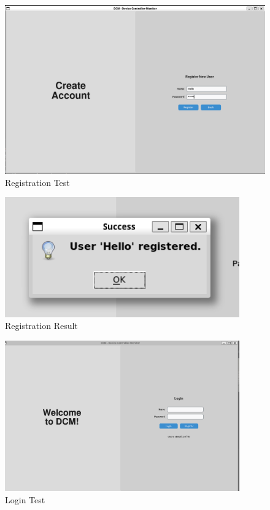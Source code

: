 \documentclass{article}
\begin{document}
\begin{tcolorbox}
    \begin{figure}[H]\label{regtest}
        \includegraphics[width=\textwidth]{registertest.png}
        \caption{Registration Test}
    \end{figure}
\end{tcolorbox}

\begin{tcolorbox}
    \begin{figure}[H]\label{regres}
        \centering
        \includegraphics[width=0.9\textwidth]{registerres.png}
        \caption{Registration Result}
    \end{figure}
\end{tcolorbox}

\begin{tcolorbox}
    \begin{figure}[H]\label{logtest}
        \centering
        \includegraphics[width=0.9\textwidth]{logintest.png}
        \caption{Login Test}
    \end{figure}
\end{tcolorbox}
\end{document}
